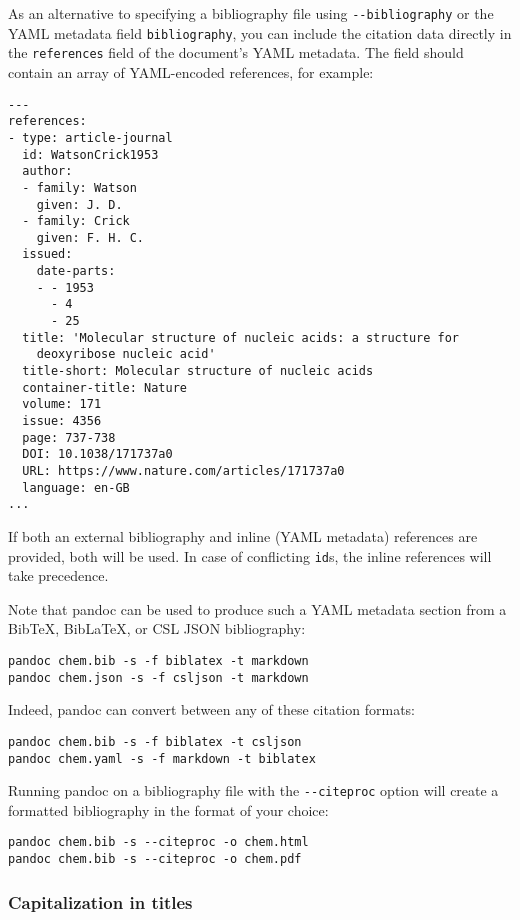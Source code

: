 \documentclass[
  a4paper,
]{article}
\begin{document}
As an alternative to specifying a bibliography file using
\texttt{-\/-bibliography} or the YAML metadata field
\texttt{bibliography}, you can include the citation data directly in the
\texttt{references} field of the document's YAML metadata. The field
should contain an array of YAML-encoded references, for example:

\begin{verbatim}
---
references:
- type: article-journal
  id: WatsonCrick1953
  author:
  - family: Watson
    given: J. D.
  - family: Crick
    given: F. H. C.
  issued:
    date-parts:
    - - 1953
      - 4
      - 25
  title: 'Molecular structure of nucleic acids: a structure for
    deoxyribose nucleic acid'
  title-short: Molecular structure of nucleic acids
  container-title: Nature
  volume: 171
  issue: 4356
  page: 737-738
  DOI: 10.1038/171737a0
  URL: https://www.nature.com/articles/171737a0
  language: en-GB
...
\end{verbatim}

If both an external bibliography and inline (YAML metadata) references
are provided, both will be used. In case of conflicting \texttt{id}s,
the inline references will take precedence.

Note that pandoc can be used to produce such a YAML metadata section
from a BibTeX, BibLaTeX, or CSL JSON bibliography:

\begin{verbatim}
pandoc chem.bib -s -f biblatex -t markdown
pandoc chem.json -s -f csljson -t markdown
\end{verbatim}

Indeed, pandoc can convert between any of these citation formats:

\begin{verbatim}
pandoc chem.bib -s -f biblatex -t csljson
pandoc chem.yaml -s -f markdown -t biblatex
\end{verbatim}

Running pandoc on a bibliography file with the \texttt{-\/-citeproc}
option will create a formatted bibliography in the format of your
choice:

\begin{verbatim}
pandoc chem.bib -s --citeproc -o chem.html
pandoc chem.bib -s --citeproc -o chem.pdf
\end{verbatim}

\hypertarget{capitalization-in-titles}{%
\subsubsection{Capitalization in
titles}\label{capitalization-in-titles}}
\end{document}
